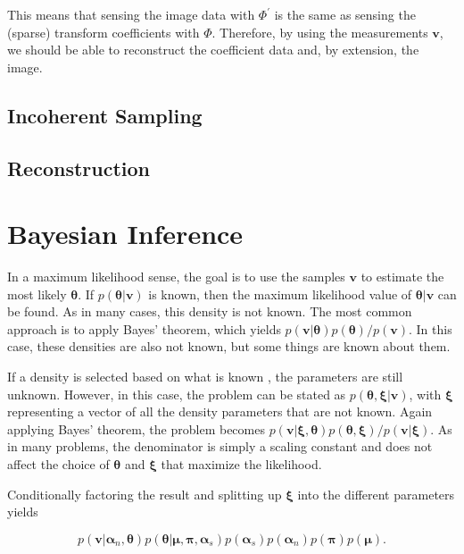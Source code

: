 \documentclass{IEEEtran}
\newcommand{\bfv}{\mathbf{v}}
\begin{document}
This means that sensing the image data with $\Phi^\prime$ is the same as sensing the (sparse) transform coefficients with $\Phi$.  Therefore, by using the measurements $\bfv$, we should be able to reconstruct the coefficient data and, by extension, the image.

\subsection{Incoherent Sampling}
\label{sub:incoherence}



\subsection{Reconstruction}

\section{Bayesian Inference}

In a maximum likelihood sense, the goal is to use the samples
$\mathbf{v}$ to estimate the most likely $\mathbf{\theta}$.  If $p(\mathbf{\theta}|\mathbf{v})$ is known, then the
maximum likelihood value of $\mathbf{\theta}|\mathbf{v}$ can be
found.  As in many cases, this density is not known.  The most common
approach is to apply Bayes' theorem, which yields
$p(\mathbf{v}|\mathbf{\theta})p(\mathbf{\theta})/p(\mathbf{v})$.  In
  this case, these densities are also not known, but some things are
  known about them.

If a density is selected based on what is known , the parameters are
still unknown.  However, in this case, the problem can be stated as
$p(\mathbf{\theta},\mathbf{\xi}|\mathbf{v})$, with $\mathbf{\xi}$
representing a vector of all the density parameters that are not
known.  Again applying Bayes' theorem, the problem becomes
$p(\mathbf{v}|\mathbf{\xi},\mathbf{\theta})p(\mathbf{\theta},\mathbf{\xi})/p(\mathbf{v}|\mathbf{\xi})$.
As in many problems, the denominator is simply a scaling constant and
does not affect the choice of $\mathbf{\theta}$ and $\mathbf{\xi}$
that maximize the likelihood.  

Conditionally factoring the result and splitting up $\mathbf{\xi}$
into the different parameters yields

\begin{equation}
p(\mathbf{v}|\mathbf{\alpha}_n,\mathbf{\theta})p(\mathbf{\theta}|\mathbf{\mu},\mathbf{\pi},\mathbf{\alpha}_s)p(\mathbf{\alpha}_s)p(\mathbf{\alpha}_n)p(\mathbf{\pi})p(\mathbf{\mu}).
\label{bayesprimary}
\end{equation}
\end{document}
